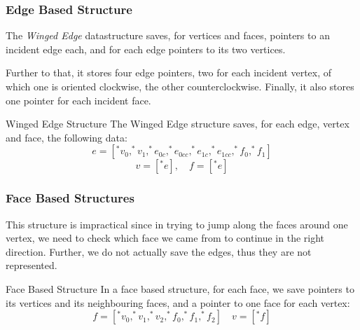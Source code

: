 \documentclass[english]{panikzettel}
\begin{document}
\subsubsection*{Edge Based Structure}

\begin{halfboxl}
The \emph{Winged Edge} datastructure saves, for vertices and faces, pointers to an incident edge each, and for each edge pointers to its two vertices.

Further to that, it stores four edge pointers, two for each incident vertex, of which one is oriented clockwise, the other counterclockwise. Finally, it also stores one pointer for each incident face.
\end{halfboxl}%
\begin{halfboxr}
\vspace{-\baselineskip}
\begin{defi}{Winged Edge Structure}
The Winged Edge structure saves, for each edge, vertex and face, the following data:
$$e = [^*v_0,^*v_1,^*e_{0c},^*e_{0cc},^*e_{1c},^*e_{1cc},^*f_0,^*f_1]$$
$$v=[^*e], \quad f=[^*e]$$
\end{defi}
\end{halfboxr}

\begin{halfboxl}
\subsubsection*{Face Based Structures}

This structure is impractical since in trying to jump along the faces around one vertex, we need to check which face we came from to continue in the right direction. Further, we do not actually save the edges, thus they are not represented.
\end{halfboxl}%
\begin{halfboxr}
\vspace{-\baselineskip}
\begin{defi}{Face Based Structure}
In a face based structure, for each face, we save pointers to its vertices and its neighbouring faces, and a pointer to one face for each vertex:
$$f=[^*v_0,^*v_1,^*v_2,^*f_0,^*f_1,^*f_2] \quad v = [^*f]$$
\end{defi}
\end{halfboxr}
\end{document}

